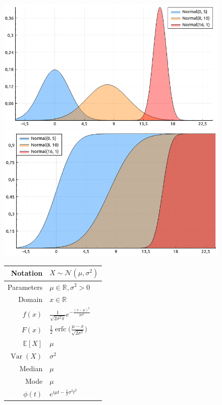 \documentclass[a4paper,11pt]{article}
\theoremstyle{plain}
\theoremstyle{definition}
\newcommand{\ME}{\mathbb{E}}
\newcommand{\MR}{\mathbb{R}}
\newcommand{\Var}{\operatorname{Var}}
\begin{document}
\begin{figure}[!htb]\centering
	\begin{minipage}{0.55\textwidth}
		\includegraphics[width=\linewidth, right]{normal_pdf}
		\captionsetup{labelformat=empty}
		\includegraphics[width=\linewidth, right]{normal_cdf}
		\captionsetup{labelformat=empty}
	\end{minipage}
	\begin{minipage}{0.4\textwidth}
		\begin{tabular}{| r | l |}
			\hline
			Notation & $X \sim \mathcal{N}(\mu, \sigma^2)$ \\
			\hline
			Parameters & $\mu \in \MR, \sigma^2 > 0 $ \\
			\hline
			Domain & $x \in \MR$  \\
			\hline
			$f(x)$ & $ \frac{1}{\sqrt{2\sigma^2\pi}}e^{-\frac{(x-\mu)^2}{2\sigma^2}}  $ \\
			\hline
			$F(x)$ & $ \frac{1}{2} \operatorname{erfc}\Big( \frac{\mu-x}{\sqrt{2\sigma^2}} \Big) $ \\
			\hline
			$\ME[X]$ & $ \mu$ \\
			\hline
			$\Var(X)$ & $\sigma^2$\\
			\hline
			Median & $\mu$ \\
			\hline
			Mode & $\mu$ \\
			\hline
			$\phi(t)$ & $ e^{i\mu t - \frac{1}{2}\sigma^2t^2}  $ \\
			\hline
		\end{tabular}
	\end{minipage}
\end{figure}
\end{document}
